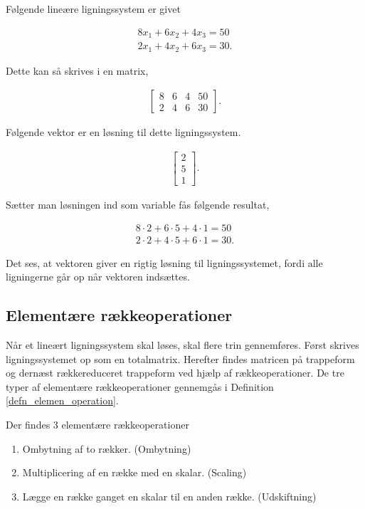 \begin{eks}
Følgende lineære ligningssystem er givet

\begin{align*}
8x_1+6x_2+4x_3 = 50 \\
2x_1+4x_2+6x_3 = 30.
\end{align*}

Dette kan så skrives i en matrix,

\begin{align*}
\begin{bmatrix}
8 & 6 & 4 & 50 \\
2 & 4 & 6 & 30
\end{bmatrix}.
\end{align*}

Følgende vektor er en løsning til dette ligningssystem.

\begin{align*}
\begin{bmatrix}
2 \\
5 \\
1
\end{bmatrix}.
\end{align*}

Sætter man løsningen ind som variable fås følgende resultat,

\begin{align*}
8 \cdot 2 + 6 \cdot 5 + 4 \cdot 1 = 50 \\
2 \cdot 2 + 4 \cdot 5 + 6 \cdot 1 = 30.
\end{align*}

Det ses, at vektoren giver en rigtig løsning til ligningssystemet, fordi alle ligningerne går op når vektoren indsættes. 

\end{eks}

\subsection{Elementære rækkeoperationer}
Når et lineært ligningssystem skal løses, skal flere trin gennemføres. Først skrives ligningssystemet op som en totalmatrix. Herefter findes matricen på trappeform og dernæst rækkereduceret trappeform ved hjælp af rækkeoperationer. De tre typer af elementære rækkeoperationer gennemgås i Definition \ref{defn_elemen_operation}. \\

\begin{defn}
Der findes 3 elementære rækkeoperationer
\begin{enumerate}
\item Ombytning af to rækker. (Ombytning)
\item Multiplicering af en række med en skalar. (Scaling)
\item Lægge en række ganget en skalar til en anden række. (Udskiftning)
\end{enumerate}
\label{defn_elemen_operation}
\end{defn}
 

